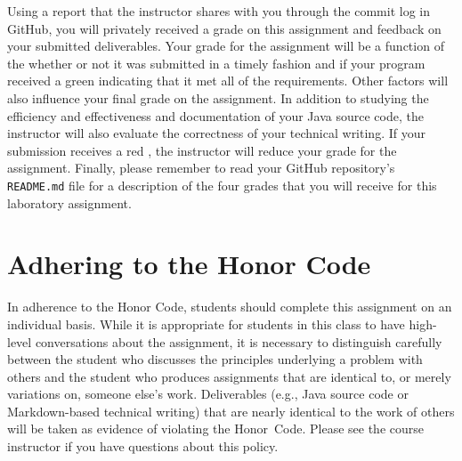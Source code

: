 \documentclass[11pt]{article}
\newcommand{\program}[1]{\lstinline{#1}}
\newcommand{\checkmark}{\ding{51}}
\newcommand{\naughtmark}{\ding{55}}
\begin{document}
Using a report that the instructor shares with you through the commit log in
GitHub, you will privately received a grade on this assignment and feedback on
your submitted deliverables. Your grade for the assignment will be a function of
the whether or not it was submitted in a timely fashion and if your program
received a green \checkmark{} indicating that it met all of the requirements.
Other factors will also influence your final grade on the assignment. In
addition to studying the efficiency and effectiveness and documentation of your
Java source code, the instructor will also evaluate the correctness of your
technical writing. If your submission receives a red \naughtmark{}, the
instructor will reduce your grade for the assignment. Finally, please remember
to read your GitHub repository's \program{README.md} file for a description of
the four grades that you will receive for this laboratory assignment.

\section*{Adhering to the Honor Code}

In adherence to the Honor Code, students should complete this assignment on an
individual basis. While it is appropriate for students in this class to have
high-level conversations about the assignment, it is necessary to distinguish
carefully between the student who discusses the principles underlying a problem
with others and the student who produces assignments that are identical to, or
merely variations on, someone else's work. Deliverables (e.g., Java source code
or Markdown-based technical writing) that are nearly identical to the work of
others will be taken as evidence of violating the \mbox{Honor Code}. Please see
the course instructor if you have questions about this policy.
\end{document}
